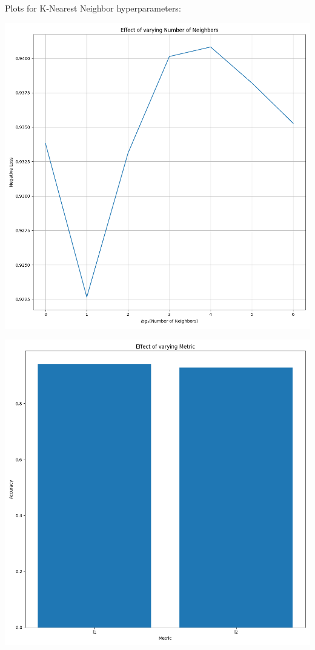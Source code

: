 \documentclass[12pt, letterpaper]{article}
\begin{document}
Plots for K-Nearest Neighbor hyperparameters:

\includegraphics[scale=\myscale]{knn_Number of Neighbors.png}

\includegraphics[scale=\myscale]{knn_Metric.png}
\end{document}
